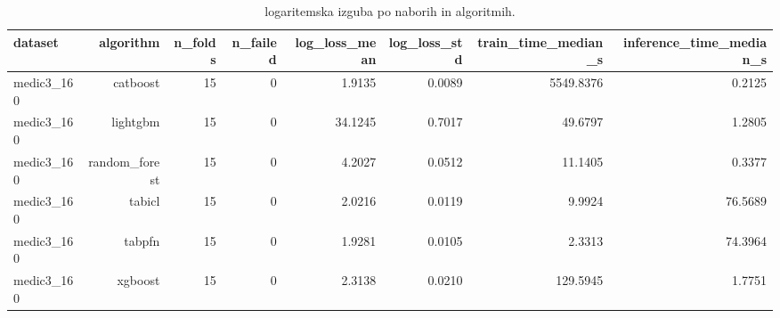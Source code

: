 \begin{table}[htbp]
\centering
\caption{logaritemska izguba po naborih in algoritmih.}
\label{tab:per-dataset}
\begin{tabular}{lrrrrrrr}
\hline
dataset & algorithm & n\_folds & n\_failed & log\_loss\_mean & log\_loss\_std & train\_time\_median\_s & inference\_time\_median\_s \\
\hline
medic3\_160 & catboost & 15 & 0 & 1.9135 & 0.0089 & 5549.8376 & 0.2125 \\
medic3\_160 & lightgbm & 15 & 0 & 34.1245 & 0.7017 & 49.6797 & 1.2805 \\
medic3\_160 & random\_forest & 15 & 0 & 4.2027 & 0.0512 & 11.1405 & 0.3377 \\
medic3\_160 & tabicl & 15 & 0 & 2.0216 & 0.0119 & 9.9924 & 76.5689 \\
medic3\_160 & tabpfn & 15 & 0 & 1.9281 & 0.0105 & 2.3313 & 74.3964 \\
medic3\_160 & xgboost & 15 & 0 & 2.3138 & 0.0210 & 129.5945 & 1.7751 \\
\hline
\end{tabular}
\end{table}
